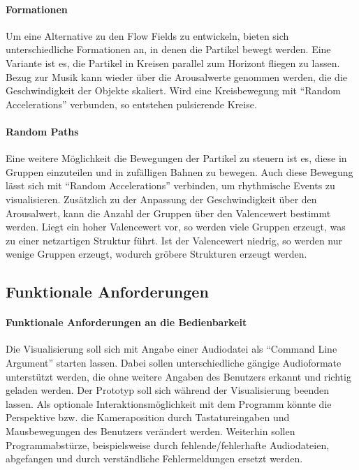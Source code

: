 \documentclass[11pt,a4paper]{article}
\begin{document}
\paragraph{Formationen}
Um eine Alternative zu den Flow Fields zu entwickeln, bieten sich unterschiedliche Formationen an, in denen die Partikel bewegt werden. Eine Variante ist es, die Partikel in Kreisen parallel zum Horizont fliegen zu lassen.\\
Bezug zur Musik kann wieder über die Arousalwerte genommen werden, die die Geschwindigkeit der Objekte skaliert. Wird eine Kreisbewegung mit ``Random Accelerations'' verbunden, so entstehen pulsierende Kreise.

\paragraph{Random Paths}
Eine weitere Möglichkeit die Bewegungen der Partikel zu steuern ist es, diese in Gruppen einzuteilen und in zufälligen Bahnen zu bewegen. Auch diese Bewegung lässt sich mit ``Random Accelerations'' verbinden, um rhythmische Events zu visualisieren. Zusätzlich zu der Anpassung der Geschwindigkeit über den Arousalwert, kann die Anzahl der Gruppen über den Valencewert bestimmt werden. Liegt ein hoher Valencewert vor, so werden viele Gruppen erzeugt, was zu einer netzartigen Struktur führt. Ist der Valencewert niedrig, so werden nur wenige Gruppen erzeugt, wodurch gröbere Strukturen erzeugt werden.

\newpage
\subsection{Funktionale Anforderungen}
\paragraph{Funktionale Anforderungen an die Bedienbarkeit}
Die Visualisierung soll sich mit Angabe einer Audiodatei als ``Command Line Argument'' starten lassen. Dabei sollen unterschiedliche gängige Audioformate unterstützt werden, die ohne weitere Angaben des Benutzers erkannt und richtig geladen werden. Der Prototyp soll sich während der Visualisierung beenden lassen. Als optionale Interaktionsmöglichkeit mit dem Programm könnte die Perspektive bzw. die Kameraposition durch Tastatureingaben und Mausbewegungen des Benutzers verändert werden. Weiterhin sollen Programmabstürze, beispielsweise durch fehlende/fehlerhafte Audiodateien, abgefangen und durch verständliche Fehlermeldungen ersetzt werden.
\end{document}
